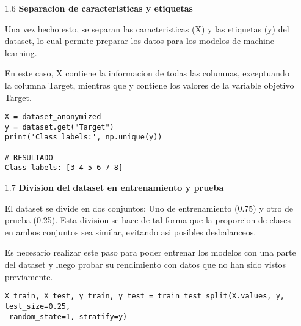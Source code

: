 \documentclass{article}
\begin{document}
\bigskip

\begin{itemize}

\item[1.6]  {\bf Separacion de caracteristicas y etiquetas}

Una vez hecho esto, se separan las caracteristicas (X) y las etiquetas (y) del dataset, lo cual permite preparar los datos para los modelos de machine learning.

En este caso, X contiene la informacion de todas las columnas, exceptuando la columna Target, mientras que y contiene los valores de la variable objetivo Target.

\begin{tcolorbox}[width=14cm]
\begin{scriptsize}
\begin{verbatim}
X = dataset_anonymized
y = dataset.get("Target")
print('Class labels:', np.unique(y))

# RESULTADO
Class labels: [3 4 5 6 7 8]
\end{verbatim}
\end{scriptsize}
\end{tcolorbox}

\end{itemize}

\bigskip

\begin{itemize}

\item[1.7]  {\bf Division del dataset en entrenamiento y prueba}

El dataset se divide en dos conjuntos: Uno de entrenamiento (0.75) y otro de prueba (0.25). Esta division se hace de tal forma que la proporcion de clases en ambos conjuntos sea similar, evitando asi posibles desbalanceos.

Es necesario realizar este paso para poder entrenar los modelos con una parte del dataset y luego probar su rendimiento con datos que no han sido vistos previamente.

\begin{tcolorbox}[width=14cm]
\begin{scriptsize}
\begin{verbatim}
X_train, X_test, y_train, y_test = train_test_split(X.values, y, test_size=0.25,
 random_state=1, stratify=y)
\end{verbatim}
\end{scriptsize}
\end{tcolorbox}

\end{itemize}
\end{document}
